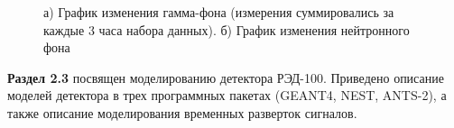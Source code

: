  \begin{figure}[ht!]
  \begin{minipage}[ht]{0.49\linewidth}
  \end{minipage}
  \hfill
  \begin{minipage}[ht]{0.49\linewidth}
  \end{minipage}
  \caption[Графики изменения гамма и нейтронного фонов.]{а) График изменения гамма-фона (измерения суммировались за каждые 3 часа набора данных). б) График изменения нейтронного фона}
  \label{img:gammaneutronbckg}  
\end{figure}

 \textbf{Раздел 2.3} посвящен моделированию детектора РЭД-100. Приведено описание моделей детектора в трех программных пакетах (GEANT4, NEST, ANTS-2), а также описание моделирования временных разверток сигналов. 

